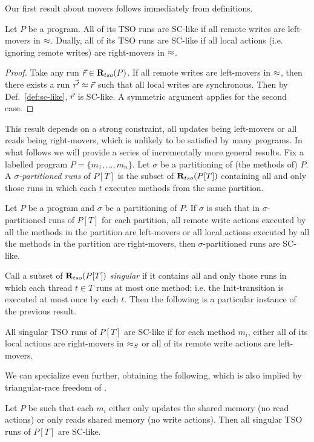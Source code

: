 Our first result about movers follows immediately from definitions.
\begin{lemma}
Let $P$ be a program.
All of its TSO runs are SC-like if all remote writes are left-movers in $\approx$.
Dually, all of its TSO runs are SC-like if all local actions (i.e. ignoring remote writes) are right-movers in $\approx$.
\end{lemma}
\begin{proof}
Take any run $\vec{r}\in \mathbf{R}_{tso}(P)$.
If all remote writes are left-movers in $\approx$, then there exists a run $\vec{r'}\approx\vec{r}$ such that all local writes are synchronous. 
Then by Def.~\ref{def:sc-like}, $\vec{r}$ is SC-like.
A symmetric argument applies for the second case.
\end{proof}

This result depends on a strong constraint, all updates being left-movers or all reads being right-movers, which is unlikely to be satisfied by many programs.
In what follows we will provide a series of incrementally more general results.
Fix a labelled program $P=\{m_1,\ldots,m_n\}$.
Let $\sigma$ be a partitioning of (the methods of) $P$.
A {\em $\sigma$-partitioned runs} of $P[T]$ is the subset of $\mathbf{R}_{tso}(P[T])$ containing all and only those runs in which each $t$ executes methods from the same partition.
\begin{lemma}
Let $P$ be a program and $\sigma$ be a partitioning of $P$.
If $\sigma$ is such that in $\sigma$-partitioned runs of $P[T]$ for each partition, all remote write actions executed by all the methods in the partition are left-movers or all local actions executed by all the methods in the partition are right-movers, then $\sigma$-partitioned runs are SC-like.
\end{lemma}
Call a subset of $\mathbf{R}_{tso}(P[T])$ {\em singular} if it contains all and only those runs in which each thread $t\in T$ runs at most one method; i.e. the {\sc\small Init}-transition is executed at most once by each $t$.
Then the following is a particular instance of the previous result.
\begin{corollary}
All singular TSO runs of $P[T]$ are SC-like if for each method $m_i$, either all of its local actions are right-movers in $\approx_S$ or all of its remote write actions are left-movers. 
\end{corollary}
We can specialize even further, obtaining the following, which is also implied by triangular-race freedom of \cite{Owe2009}.
\begin{corollary}
Let $P$ be such that each $m_i$ either only updates the shared memory (no read actions) or only reads shared memory (no write actions).
Then all singular TSO runs of $P[T]$ are SC-like.
\end{corollary}

